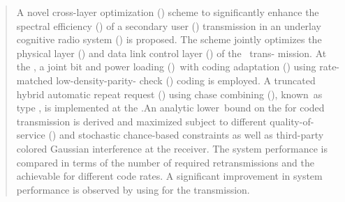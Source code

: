 \setlength{\parindent}{0em}
\begin{abstract}
A novel cross-layer optimization (\myCLO{}) scheme to
significantly enhance the spectral efficiency (\mySE{}) of a secondary
user (\mySU{}) transmission in an underlay cognitive radio system
(\myUCRS{}) is proposed. The scheme jointly optimizes the physical
layer (\myPHY{}) and data link control layer (\myDLC{}) of the \mySU{}~trans-\linebreak
mission. At the \myPHY{}, a joint \!bit and power loading \!(\myJBPL{})~with
coding adaptation (\myCA{}) using rate-matched low-density-parity-
check (\myLDPC) coding is employed. A truncated hybrid automatic
repeat request (\myTHARQ{}) using chase combining (\myCC{}), known~as
\myARQ{} type \myII{}, is implemented at the \myDLC{}.An analytic lower~bound\linebreak
on \!the \!\mySE{} for coded transmission is derived and maximized subject
to different quality-of-service (\myQoS{}) and stochastic chance-based
constraints as well as third-party colored Gaussian interference
at the \mySU{} receiver. The system performance is compared in terms
of the number of required retransmissions and the achievable \mySU{}
\mySE{} for different code rates. A significant improvement in system
performance is observed by using \myCC{} for the \mySU{} transmission.
\end{abstract}

